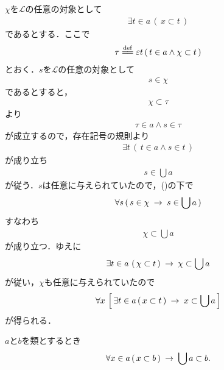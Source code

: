 	\begin{sketch}
		$\chi$を$\mathcal{L}$の任意の対象として
		\begin{align}
			\exists t \in a\, (\, x \subset t\, )
			\label{fom:thm_union_is_bigger_than_any_member_1}
		\end{align}
		であるとする．ここで
		\begin{align}
			\tau \defeq \varepsilon t\, (\, t \in a \wedge \chi \subset t\, )
		\end{align}
		とおく．$s$を$\mathcal{L}$の任意の対象として
		\begin{align}
			s \in \chi
		\end{align}
		であるとすると，
		\begin{align}
			\chi \subset \tau
		\end{align}
		より
		\begin{align}
			\tau \in a \wedge s \in \tau
		\end{align}
		が成立するので，存在記号の規則より
		\begin{align}
			\exists t\, \left(\, t \in a \wedge s \in t\, \right)
		\end{align}
		が成り立ち
		\begin{align}
			s \in \bigcup a
		\end{align}
		が従う．$s$は任意に与えられていたので，()の下で
		\begin{align}
			\forall s\, (\, s \in \chi \hspace{0.25em}\rightarrow\hspace{0.25em} s \in \bigcup a\, )
		\end{align}
		すなわち
		\begin{align}
			\chi \subset \bigcup a
		\end{align}
		が成り立つ．ゆえに
		\begin{align}
			\exists t \in a\, \left(\, \chi \subset t\, \right) \hspace{0.25em}\rightarrow\hspace{0.25em} \chi \subset \bigcup a
		\end{align}
		が従い，$\chi$も任意に与えられていたので
		\begin{align}
			\forall x\, \left[\, \exists t \in a\, (\, x \subset t\, ) \hspace{0.25em}\rightarrow\hspace{0.25em} x \subset \bigcup a\, \right]
		\end{align}
		が得られる．
		\QED
	\end{sketch}
	
	\begin{screen}
		\begin{thm}[部分集合の合併は部分類]\label{thm:union_of_subsets_is_subclass}
			$a$と$b$を類とするとき
			\begin{align}
				\forall x \in a\, (\, x \subset b\, ) \hspace{0.25em}\rightarrow\hspace{0.25em} \bigcup a \subset b.
			\end{align}
		\end{thm}
	\end{screen}
	
